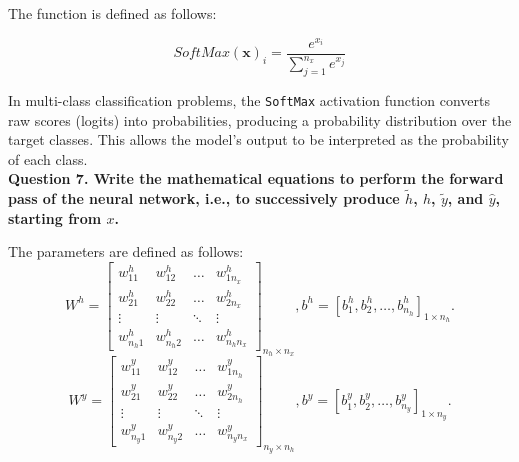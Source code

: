 \documentclass{article}
\begin{document}
The  function is defined as follows:

\[
SoftMax(\mathbf{x})_i = \frac{e^{x_i}}{\sum_{j=1}^{n_x} e^{x_j}}
\]

In multi-class classification problems, the \texttt{SoftMax} activation function converts raw scores (logits) into probabilities, producing a probability distribution over the target classes. This allows the model's output to be interpreted as the probability of each class.\\

\noindent \textbf{Question 7. Write the mathematical equations to perform the forward pass of the neural network, i.e., to successively produce \(\tilde{h}\), \(h\), \(\tilde{y}\), and \(\hat{y}\), starting from \(x\).}

The parameters are defined as follows:
\[
W^h = 
\begin{bmatrix}
w^h_{11} & w^h_{12} & \dots & w^h_{1 n_x} \\
w^h_{21} & w^h_{22} & \dots & w^h_{2 n_x} \\
\vdots & \vdots & \ddots & \vdots \\
w^h_{n_h 1} & w^h_{n_h 2} & \dots & w^h_{n_h n_x}
\end{bmatrix}_{n_h \times n_x},
b^h = [b^h_1, b^h_2, \dots, b^h_{n_h}]_{1 \times n_h}.
\]
\[
W^y = 
\begin{bmatrix}
w^y_{11} & w^y_{12} & \dots & w^y_{1 n_h} \\
w^y_{21} & w^y_{22} & \dots & w^y_{2 n_h} \\
\vdots & \vdots & \ddots & \vdots \\
w^y_{n_y 1} & w^y_{n_y 2} & \dots & w^y_{n_y n_x}
\end{bmatrix}_{n_y \times n_h},
b^y = [b^y_1, b^y_2, \dots, b^y_{n_y}]_{1 \times n_y}.
\]
\end{document}
